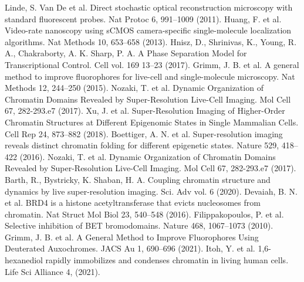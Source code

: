 \documentclass{ucetd}
\begin{document}
\newline
\noindent [14] Linde, S. Van De et al. Direct stochastic optical reconstruction microscopy with standard fluorescent probes. Nat Protoc 6, 991–1009 (2011). 
\newline
\noindent [15] Huang, F. et al. Video-rate nanoscopy using sCMOS camera-specific single-molecule localization algorithms. Nat Methods 10, 653–658 (2013). 
\newline
\noindent [16] Hnisz, D., Shrinivas, K., Young, R. A., Chakraborty, A. K. Sharp, P. A. A Phase Separation Model for Transcriptional Control. Cell vol. 169 13–23 (2017). 
\newline
\noindent [17] Grimm, J. B. et al. A general method to improve fluorophores for live-cell and single-molecule microscopy. Nat Methods 12, 244–250 (2015). 
\newline
\noindent [18] Nozaki, T. et al. Dynamic Organization of Chromatin Domains Revealed by Super-Resolution Live-Cell Imaging. Mol Cell 67, 282-293.e7 (2017). 
\newline
\noindent [19] Xu, J. et al. Super-Resolution Imaging of Higher-Order Chromatin Structures at Different Epigenomic States in Single Mammalian Cells. Cell Rep 24, 873–882 (2018). 
\newline
\noindent [20] Boettiger, A. N. et al. Super-resolution imaging reveals distinct chromatin folding for different epigenetic states. Nature 529, 418–422 (2016). 
\newline
\noindent [21] Nozaki, T. et al. Dynamic Organization of Chromatin Domains Revealed by Super-Resolution Live-Cell Imaging. Mol Cell 67, 282-293.e7 (2017). 
\noindent [3] Barth, R., Bystricky, K. Shaban, H. A. Coupling chromatin structure and dynamics by live super-resolution imaging. Sci. Adv vol. 6 (2020). 
\newline
\noindent [22] Devaiah, B. N. et al. BRD4 is a histone acetyltransferase that evicts nucleosomes from chromatin. Nat Struct Mol Biol 23, 540–548 (2016). 
\newline
\noindent [23] Filippakopoulos, P. et al. Selective inhibition of BET bromodomains. Nature 468, 1067–1073 (2010). 
\newline
\noindent [24] Grimm, J. B. et al. A General Method to Improve Fluorophores Using Deuterated Auxochromes. JACS Au 1, 690–696 (2021). 
\newline
\noindent [25] Itoh, Y. et al. 1,6-hexanediol rapidly immobilizes and condenses chromatin in living human cells. Life Sci Alliance 4, (2021). 
\newline
\end{document}
